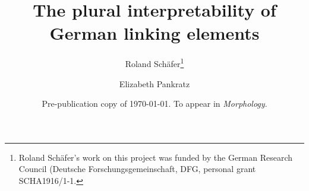 \usepackage{natbib}
\usepackage[margin=4cm]{geometry}

\usepackage{authblk}
\author[1]{Roland Schäfer\thanks{Roland Schäfer's work on this project was funded by the German Research Council (Deutsche Forschungsgemeinschaft, DFG, personal grant SCHA1916/1-1.}}
\author[2]{Elizabeth Pankratz}

\title{The plural interpretability of German linking elements}
\date{Pre-publication copy of \today. To appear in \textit{Morphology}.}

\newenvironment{acknowledgements}{\section*{Acknowledgements}}{}
\newenvironment{ethicalstandards}{\section*{Compliance with ethical standards}}{}
\newcommand{\keywords}[1]{\newline\vspace{\baselineskip}\newline\noindent \textbf{Keywords: #1}}

